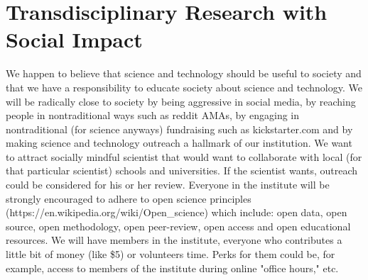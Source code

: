 \section{Transdisciplinary Research with Social Impact}

We happen to believe that science and technology should be useful to society and that we have a responsibility to educate society about science and technology. We will be radically close to society by being aggressive in social media, by reaching people in nontraditional ways such as reddit AMAs, by engaging in nontraditional (for science anyways) fundraising such as kickstarter.com and by making science and technology outreach a hallmark of our institution. We want to attract socially mindful scientist that would want to collaborate with local (for that particular scientist) schools and universities. If the scientist wants, outreach could be considered for his or her review. Everyone in the institute will be strongly encouraged to adhere to open science principles (https://en.wikipedia.org/wiki/Open_science) which include: open data, open source, open methodology, open peer-review, open access and open educational resources. We will have members in the institute, everyone who contributes a little bit of money (like \$5) or volunteers time. Perks for them could be, for example, access to members of the institute during online "office hours," etc. 
